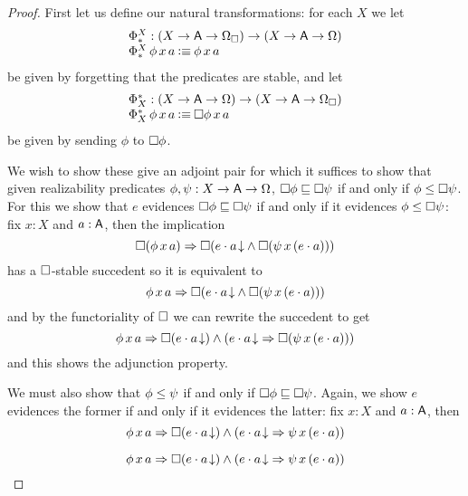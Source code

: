 \documentclass[11pt]{article}
\begin{document}
\begin{proof}
  First let us define our natural transformations: for each \(X\) we let
  \[\begin{array}{l}
      \Phi_\ast^{X} : {{({{X}\to{{{\ensuremath{\mathsf{A}}}\to{\Omega_\Box}}}})}\to{({{X}\to{{{\ensuremath{\mathsf{A}}}\to{\Omega}}}})}}
      \\
      \Phi_\ast^{X}\,\phi\,x\,a \mathbin{\vcentcolon\equiv} \phi\,x\,a
  \end{array}\]
  be given by forgetting that the predicates are stable, and let
  \[\begin{array}{l}
      \Phi^\ast_{X} : {{({{X}\to{{{\ensuremath{\mathsf{A}}}\to{\Omega}}}})}\to{({{X}\to{{{\ensuremath{\mathsf{A}}}\to{\Omega_\Box}}}})}}
      \\
      \Phi^\ast_{X}\,\phi\,x\,a \mathbin{\vcentcolon\equiv} \Box{\phi\,x\,a}
  \end{array}\]
  be given by sending \(\phi\) to \(\Box{\phi}\).

  We wish to show these give an adjoint pair for which it suffices to show that
  given realizability predicates \(\phi, \psi : {{X}\to{{{\ensuremath{\mathsf{A}}}\to{\Omega}}}}\),
  \({\Box{\phi}}\sqsubseteq{\Box{\psi}}\) if and only if
  \({\phi}\leq{\Box{\psi}}\).
  For this we show that \(e\) evidences \({\Box{\phi}}\sqsubseteq{\Box{\psi}}\) if
  and only if it evidences \({\phi}\leq{\Box{\psi}}\):
  fix \(x:X\) and \(a:\mathsf{A}\), then the implication
  \[
    \IImplies%
    {\IBox{(\phi\,x\,a)}}%
    {\IBox{(\IAnd{\ITotal{\IAp{e}{a}}}{\IBox{(\psi\,x\,(\IAp{e}{a}))}})}}
  \]
  has a \(\Box\)-stable succedent so it is equivalent to
  \[
    \IImplies%
    {\phi\,x\,a}%
    {\IBox{(\IAnd{\ITotal{\IAp{e}{a}}}{\IBox{(\psi\,x\,(\IAp{e}{a}))}})}}
  \]
  and by the functoriality of \(\Box\) we can rewrite the succedent to get
  \[
    \IImplies%
    {\phi\,x\,a}%
    {\IAnd%
      {\IBox{(\ITotal{\IAp{e}{a}})}}%
      {(\IImplies%
        {\ITotal{\IAp{e}{a}}}%
        {\IBox{(\psi\,x\,(\IAp{e}{a}))})}}}
  \]
  and this shows the adjunction property.

  We must also show that \({\phi}\leq{\psi}\) if and only if
  \({\Box{\phi}}\sqsubseteq{\Box{\psi}}\).
  Again, we show \(e\) evidences the former if and only if it evidences the
  latter:
  fix \(x:X\) and \(a:\mathsf{A}\), then
  \[
    \IImplies%
    {\phi\,x\,a}%
    {\IAnd%
      {\IBox{(\ITotal{\IAp{e}{a}})}}%
      {(\IImplies%
        {\ITotal{\IAp{e}{a}}}%
        {\psi\,x\,(\IAp{e}{a})})}}
  \]

  \[
    \IImplies%
    {\phi\,x\,a}%
    {\IAnd%
      {\IBox{(\ITotal{\IAp{e}{a}})}}%
      {(\IImplies%
        {\ITotal{\IAp{e}{a}}}%
        {\psi\,x\,(\IAp{e}{a})})}}
  \]

\end{proof}
\end{document}

